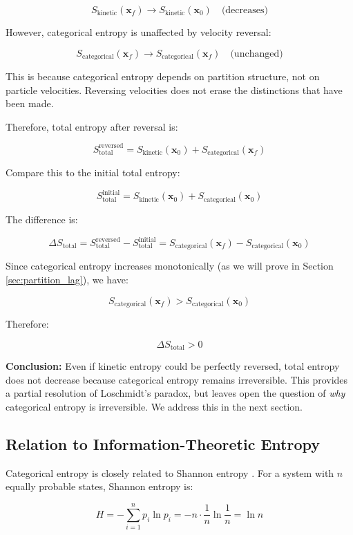 \documentclass[twocolumn,10pt]{article}
\theoremstyle{definition}
\theoremstyle{remark}
\begin{document}
$$
S_{\text{kinetic}}(\mathbf{x}_f) \to S_{\text{kinetic}}(\mathbf{x}_0) \quad \text{(decreases)}
$$

However, categorical entropy is unaffected by velocity reversal:

$$
S_{\text{categorical}}(\mathbf{x}_f) \to S_{\text{categorical}}(\mathbf{x}_f) \quad \text{(unchanged)}
$$

This is because categorical entropy depends on partition structure, not on particle velocities. Reversing velocities does not erase the distinctions that have been made.

Therefore, total entropy after reversal is:

$$
S_{\text{total}}^{\text{reversed}} = S_{\text{kinetic}}(\mathbf{x}_0) + S_{\text{categorical}}(\mathbf{x}_f)
$$

Compare this to the initial total entropy:

$$
S_{\text{total}}^{\text{initial}} = S_{\text{kinetic}}(\mathbf{x}_0) + S_{\text{categorical}}(\mathbf{x}_0)
$$

The difference is:

$$
\Delta S_{\text{total}} = S_{\text{total}}^{\text{reversed}} - S_{\text{total}}^{\text{initial}} = S_{\text{categorical}}(\mathbf{x}_f) - S_{\text{categorical}}(\mathbf{x}_0)
$$

Since categorical entropy increases monotonically (as we will prove in Section \ref{sec:partition_lag}), we have:

$$
S_{\text{categorical}}(\mathbf{x}_f) > S_{\text{categorical}}(\mathbf{x}_0)
$$

Therefore:

$$
\Delta S_{\text{total}} > 0
$$

\textbf{Conclusion:} Even if kinetic entropy could be perfectly reversed, total entropy does not decrease because categorical entropy remains irreversible. This provides a partial resolution of Loschmidt's paradox, but leaves open the question of \textit{why} categorical entropy is irreversible. We address this in the next section.

\subsection{Relation to Information-Theoretic Entropy}

Categorical entropy is closely related to Shannon entropy \cite{shannon1948}. For a system with $n$ equally probable states, Shannon entropy is:

$$
H = -\sum_{i=1}^n p_i \ln p_i = -n \cdot \frac{1}{n} \ln\frac{1}{n} = \ln n
$$
\end{document}
